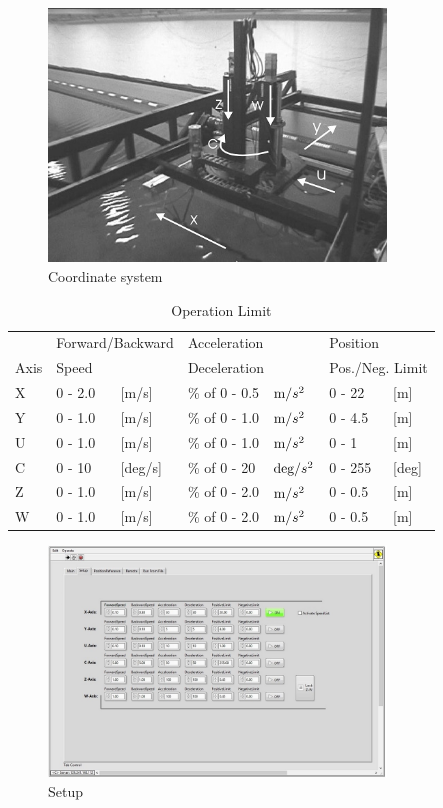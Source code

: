 \documentclass[a4paper,twoside,english]{report}
\providecommand{\tabularnewline}{\\}
\begin{document}
\begin{figure}
\centering \includegraphics[width=0.8\textwidth]{fig/towing_coordinate_photo}
\caption{Coordinate system}
\end{figure}

\begin{table}
\centering{}%
\begin{tabular}{lllllll}
\hline 
 & \multicolumn{2}{l}{Forward/Backward} & \multicolumn{2}{l}{Acceleration} & \multicolumn{2}{l}{Position}\tabularnewline
Axis & \multicolumn{2}{l}{Speed} & \multicolumn{2}{l}{Deceleration} & \multicolumn{2}{l}{Pos./Neg. Limit}\tabularnewline
\hline 
X & 0 - 2.0 & {[}m/s{]}  & \% of 0 - 0.5 & $\text{m/\ensuremath{s^{2}}}$ & 0 - 22 & {[}m{]}\tabularnewline
Y & 0 - 1.0 & {[}m/s{]}  & \% of 0 - 1.0 & $\text{m/\ensuremath{s^{2}}}$ & 0 - 4.5 & {[}m{]}\tabularnewline
U & 0 - 1.0 & {[}m/s{]}  & \% of 0 - 1.0 & $\text{m/\ensuremath{s^{2}}}$ & 0 - 1 & {[}m{]}\tabularnewline
C & 0 - 10  & {[}deg/s{]} & \% of 0 - 20 & $\text{deg/\ensuremath{s^{2}}}$ & 0 - 255 & {[}deg{]}\tabularnewline
Z & 0 - 1.0 & {[}m/s{]}  & \% of 0 - 2.0 & $\text{m/\ensuremath{s^{2}}}$ & 0 - 0.5 & {[}m{]}\tabularnewline
W & 0 - 1.0 & {[}m/s{]}  & \% of 0 - 2.0 & $\text{m/\ensuremath{s^{2}}}$ & 0 - 0.5 & {[}m{]}\tabularnewline
\hline 
\end{tabular}\caption{\label{tab: Operation Limit}Operation Limit}
\end{table}

\begin{figure}
\centering \includegraphics[width=0.8\textwidth]{fig/towing_parameteres}
\caption{\label{fig: Towing parameters}Setup}
\end{figure}
\end{document}
